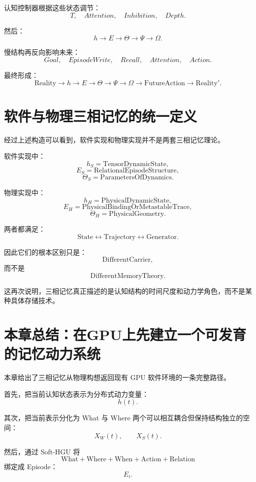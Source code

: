 认知控制器根据这些状态调节：
\[
T,
\quad
Attention,
\quad
Inhibition,
\quad
Depth.
\]

然后：
\[
h
\rightarrow
E
\rightarrow
\Theta
\rightarrow
\Psi
\rightarrow
\Omega.
\]

慢结构再反向影响未来：
\[
Goal,
\quad
EpisodeWrite,
\quad
Recall,
\quad
Attention,
\quad
Action.
\]

最终形成：
\[
\boxed{
\mathrm{Reality}
\rightarrow
h
\rightarrow
E
\rightarrow
\Theta
\rightarrow
\Psi
\rightarrow
\Omega
\rightarrow
\mathrm{FutureAction}
\rightarrow
\mathrm{Reality}'.
}
\]

\section{软件与物理三相记忆的统一定义}

经过上述构造可以看到，软件实现和物理实现并不是两套三相记忆理论。

软件实现中：
\[
h_S
=
\mathrm{TensorDynamicState},
\]
\[
E_S
=
\mathrm{RelationalEpisodeStructure},
\]
\[
\Theta_S
=
\mathrm{ParametersOfDynamics}.
\]

物理实现中：
\[
h_H
=
\mathrm{PhysicalDynamicState},
\]
\[
E_H
=
\mathrm{PhysicalBindingOrMetastableTrace},
\]
\[
\Theta_H
=
\mathrm{PhysicalGeometry}.
\]

两者都满足：
\[
\boxed{
\mathrm{State}
\leftrightarrow
\mathrm{Trajectory}
\leftrightarrow
\mathrm{Generator}.
}
\]

因此它们的根本区别只是：
\[
\boxed{
\mathrm{DifferentCarrier},
}
\]
而不是
\[
\boxed{
\mathrm{DifferentMemoryTheory}.
}
\]

这再次说明，三相记忆真正描述的是认知结构的时间尺度和动力学角色，而不是某种具体存储技术。

\section{本章总结：在GPU上先建立一个可发育的记忆动力系统}

本章给出了三相记忆从物理构想返回现有 GPU 软件环境的一条完整路径。

首先，把当前认知状态表示为分布式动力变量：
\[
h(t).
\]

其次，把当前表示分化为 What 与 Where 两个可以相互耦合但保持结构独立的空间：
\[
X_W(t),
\qquad
X_S(t).
\]

然后，通过 Soft-HGU 将
\[
\mathrm{What}
+
\mathrm{Where}
+
\mathrm{When}
+
\mathrm{Action}
+
\mathrm{Relation}
\]
绑定成 Episode：
\[
E_i.
\]

